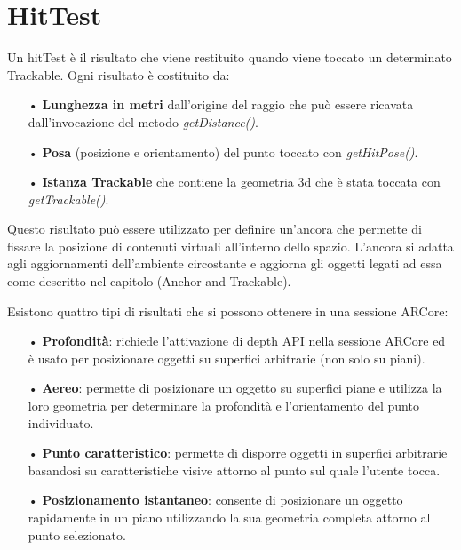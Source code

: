 \documentclass[crop=false, class=book]{standalone}
\begin{document}
	\chapter{HitTest}
	
	Un hitTest è il risultato che viene restituito quando viene toccato un determinato Trackable.
	Ogni risultato è costituito da:
	\begin{itemize}
		\item[•] \textbf{Lunghezza in metri} dall'origine del raggio che può essere ricavata dall'invocazione del metodo \emph{getDistance()}.
		\item[•] \textbf{Posa} (posizione e orientamento) del punto toccato con \emph{getHitPose()}.
		\item[•] \textbf{Istanza Trackable} che contiene la geometria 3d che è stata toccata con \emph{getTrackable()}.
	\end{itemize}
	
	\begin{flushleft}
	Questo risultato può essere utilizzato per definire un'ancora che permette di fissare la posizione di contenuti virtuali all'interno dello spazio. L'ancora si adatta agli aggiornamenti dell'ambiente circostante e aggiorna gli oggetti legati ad essa come descritto nel capitolo (Anchor and Trackable).\\
	\end{flushleft}	
		Esistono quattro tipi di risultati che si possono ottenere in una sessione ARCore:
		\begin{itemize}
		\item[•] \textbf{Profondità}: richiede l'attivazione di depth API nella sessione ARCore ed è usato per posizionare oggetti su superfici arbitrarie (non solo su piani).
		\item[•] \textbf{Aereo}: permette di posizionare un oggetto su superfici piane e utilizza la loro geometria per determinare la profondità e l'orientamento del punto individuato.
		\item[•] \textbf{Punto caratteristico}: permette di disporre oggetti in superfici arbitrarie basandosi su caratteristiche visive attorno al punto sul quale l'utente tocca. 
		\item[•] \textbf{Posizionamento istantaneo}: consente di posizionare un oggetto rapidamente in un piano utilizzando la sua geometria completa attorno al punto selezionato. 
	\end{itemize}
	\clearpage
	
\end{document}
